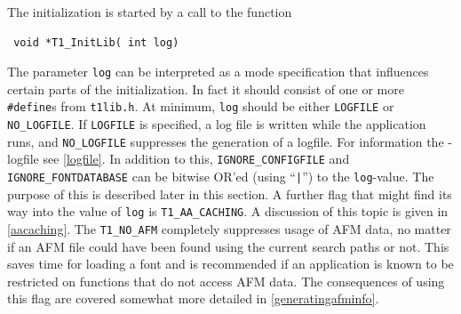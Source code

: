 The initialization is started by a call to the function
\precorr
\begin{verbatim}
 void *T1_InitLib( int log)
\end{verbatim}\postcorr
The parameter \verb+log+ can be interpreted as a mode specification that
influences certain parts of the initialization.  In fact it should consist of
one or more \verb+#define+s from \verb+t1lib.h+.  At minimum, \verb+log+
should be either \verb+LOGFILE+ or \verb+NO_LOGFILE+. If \verb+LOGFILE+ is
specified, a log file is written while the application runs, and
\verb+NO_LOGFILE+ suppresses the generation of a logfile. For information the
\tonelib-logfile see \ref{logfile}.  In addition to this,
\verb+IGNORE_CONFIGFILE+ and \verb+IGNORE_FONTDATABASE+ can be bitwise OR'ed
(using ``\verb+|+'') to the \verb+log+-value. The purpose of this is described
later in this section. A further flag that might find its way into the value
of \verb+log+ is \verb+T1_AA_CACHING+. A discussion of this topic is given in
\ref{aacaching}.
The \verb+T1_NO_AFM+ completely suppresses usage of AFM data, no matter if an
AFM file could have been found using the current search paths or not. This
saves time for loading a font and is recommended if an application is known to
be restricted on functions that do not access AFM data. The consequences of
using this flag are covered somewhat more detailed in \ref{generatingafminfo}.


